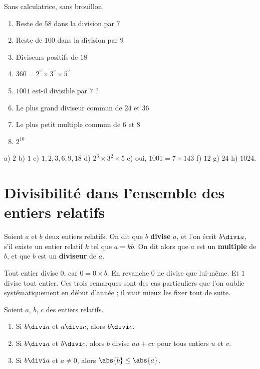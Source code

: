 \begin{automatismes}
Sans calculatrice, sans brouillon.

\begin{enumerate}[label=\textbf{\alph*)}, leftmargin=*, itemsep=0.25em]
  \item Reste de $58$ dans la division par $7$
  \item Reste de $100$ dans la division par $9$
  \item Diviseurs positifs de $18$
  \item $360 = 2^{?}\times3^{?}\times5^{?}$
  \item $1001$ est-il divisible par $7$ ?
  \item Le plus grand diviseur commun de $24$ et $36$
  \item Le plus petit multiple commun de $6$ et $8$
  \item $2^{10}$
\end{enumerate}
\end{automatismes}

\begin{corrige}[automatismes]
a) $2$ \quad b) $1$ \quad c) $1,2,3,6,9,18$ \quad
d) $2^{3}\times3^{2}\times5$ \quad e) oui, $1001 = 7\times143$ \quad
f) $12$ \quad g) $24$ \quad h) $1024$.
\end{corrige}

\section{Divisibilité dans l'ensemble des entiers relatifs}

\begin{definition}
Soient $a$ et $b$ deux entiers relatifs. On dit que $b$ \textbf{divise} $a$,
et l'on écrit $b \divi a$, s'il existe un entier relatif $k$ tel que
$a = kb$. On dit alors que $a$ est un \textbf{multiple} de $b$, et que $b$ est
un \textbf{diviseur} de $a$.
\end{definition}

\begin{remarque}
Tout entier divise $0$, car $0 = 0 \times b$. En revanche $0$ ne divise que
lui-même. Et $1$ divise tout entier. Ces trois remarques sont des cas
particuliers que l'on oublie systématiquement en début d'année ; il vaut mieux
les fixer tout de suite.
\end{remarque}

\begin{propriete}
Soient $a$, $b$, $c$ des entiers relatifs.
\begin{enumerate}[label=\textbf{\arabic*.}, leftmargin=*, itemsep=0.15em]
  \item Si $b \divi a$ et $a \divi c$, alors $b \divi c$.
  \item Si $b \divi a$ et $b \divi c$, alors $b$ divise $au+cv$ pour tous
        entiers $u$ et $v$.
  \item Si $b \divi a$ et $a \neq 0$, alors $\abs{b} \leq \abs{a}$.
\end{enumerate}
\end{propriete}

